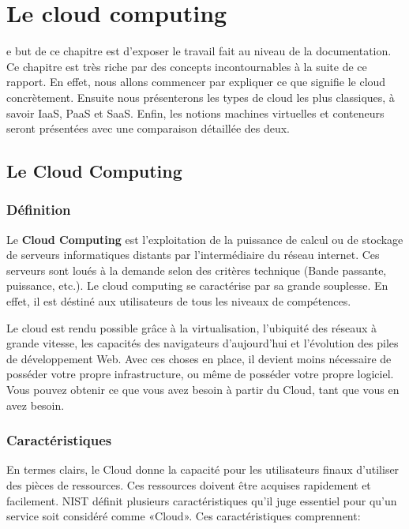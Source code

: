 \chapter{Le cloud computing}
\begin{onehalfspace}

 e but de ce chapitre est d'exposer le travail fait au niveau de la documentation. Ce chapitre est très riche par des concepts incontournables à la suite de ce rapport. En effet, nous allons commencer par expliquer ce que signifie le cloud concrètement. Ensuite nous présenterons les types de cloud les plus classiques, à savoir IaaS, PaaS et SaaS. Enfin, les notions machines virtuelles et conteneurs seront présentées avec une comparaison détaillée des deux.


\newpage


\section{Le Cloud Computing}

\subsection{Définition}

Le \textbf{Cloud Computing} est l'exploitation de la puissance de calcul ou de stockage de serveurs informatiques distants par l'intermédiaire du réseau internet. Ces serveurs sont loués à la demande selon des critères technique (Bande passante, puissance, etc.). Le cloud computing se caractérise par sa grande souplesse. En effet, il est déstiné aux utilisateurs de tous les niveaux de compétences.

Le cloud est rendu possible grâce à la virtualisation, l'ubiquité des réseaux à grande vitesse, les capacités des navigateurs d'aujourd'hui et l'évolution des piles de développement Web. Avec ces choses en place, il devient moins nécessaire de posséder votre propre infrastructure, ou même de posséder votre propre logiciel. Vous pouvez obtenir ce que vous avez besoin à partir du Cloud, tant que vous en avez besoin.


\subsection{Caractéristiques}

En termes clairs, le Cloud donne la capacité pour les utilisateurs finaux d'utiliser des pièces de ressources. Ces ressources doivent être acquises rapidement et facilement. NIST définit plusieurs caractéristiques qu'il juge essentiel pour qu'un service soit considéré comme «Cloud». Ces caractéristiques comprennent:


\end{onehalfspace}
